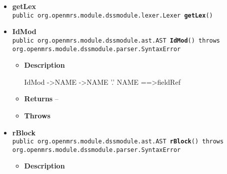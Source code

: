 {{{{{\begin{itemize}
{\begin{itemize}
{Execute the parse command
}
\item{{\bf  Returns} -- 
the AST for the source program 
}%
\item{{\bf  Throws}
}%
\end{itemize}
}%
\item{ 
\hypertarget{org.openmrs.module.dssmodule.parser.Parser.getLex()}{{\bf  getLex}\\}
\texttt{public org.openmrs.module.dssmodule.lexer.Lexer\ {\bf  getLex}()
\label{org.openmrs.module.dssmodule.parser.Parser.getLex()}}%
}%
\item{ 
\hypertarget{org.openmrs.module.dssmodule.parser.Parser.IdMod()}{{\bf  IdMod}\\}
\texttt{public org.openmrs.module.dssmodule.ast.AST\ {\bf  IdMod}() throws org.openmrs.module.dssmodule.parser.SyntaxError
\label{org.openmrs.module.dssmodule.parser.Parser.IdMod()}}%
\begin{itemize}
\item{
{\bf  Description}

IdMod -\textgreater  NAME -\textgreater  NAME '.' NAME ==\textgreater  fieldRef
}
\item{{\bf  Returns} -- 
 
}%
\item{{\bf  Throws}
}%
\end{itemize}
}%
\item{ 
\hypertarget{org.openmrs.module.dssmodule.parser.Parser.rBlock()}{{\bf  rBlock}\\}
\texttt{public org.openmrs.module.dssmodule.ast.AST\ {\bf  rBlock}() throws org.openmrs.module.dssmodule.parser.SyntaxError
\label{org.openmrs.module.dssmodule.parser.Parser.rBlock()}}%
\begin{itemize}
\item{
{\bf  Description}

}
\end{itemize}}
\end{itemize}}}}}}
